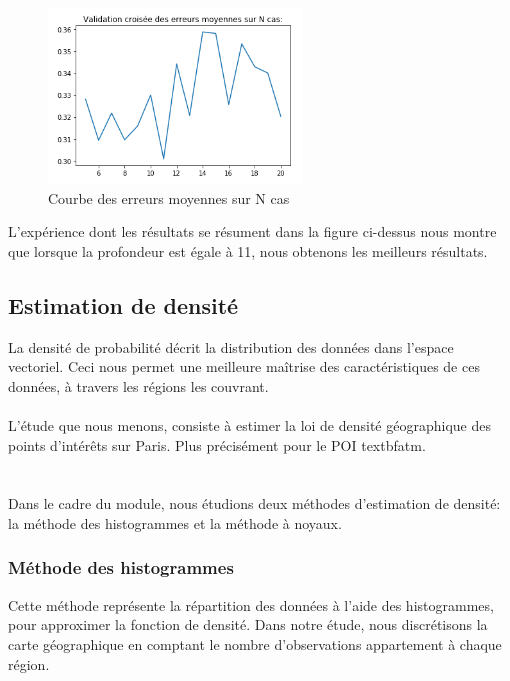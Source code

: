 \documentclass{article}
\begin{document}
\begin{figure}[H]
  \begin{center}
    \includegraphics[width=0.6\textwidth]{cross_courbe.png}
    \caption{Courbe des erreurs moyennes sur N cas}
  \end{center}
\end{figure}

L'expérience dont les résultats se résument dans la figure ci-dessus nous montre que lorsque la profondeur est égale à 11, nous obtenons les meilleurs résultats.


\subsection{Estimation de densité}
La densité de probabilité décrit la distribution des données dans l'espace vectoriel. Ceci nous permet une meilleure maîtrise des caractéristiques de ces données, à travers les régions les couvrant.\\\\
L'étude que nous menons, consiste à estimer la loi de densité géographique des points d'intérêts sur Paris. Plus précisément pour le POI textbf{atm}. \\\\
\\Dans le cadre du module, nous étudions deux méthodes d'estimation de densité: la méthode des histogrammes et la méthode à noyaux.

\subsubsection{Méthode des histogrammes}
Cette méthode représente la répartition des données à l'aide des histogrammes, pour approximer la fonction de densité.
Dans notre étude, nous discrétisons la carte géographique en comptant le nombre d'observations appartement à chaque région. 
\end{document}
